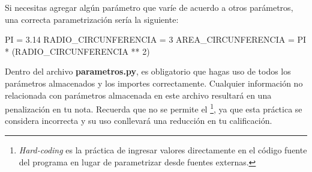 Si necesitas agregar algún parámetro que varíe de acuerdo a otros parámetros, una correcta parametrización sería la siguiente:

\begin{python}
PI = 3.14
RADIO_CIRCUNFERENCIA = 3
AREA_CIRCUNFERENCIA = PI * (RADIO_CIRCUNFERENCIA ** 2)
\end{python}

Dentro del archivo \textbf{parametros.py}, es obligatorio que hagas uso de todos los parámetros almacenados y los importes correctamente. Cualquier información no relacionada con parámetros almacenada en este archivo resultará en una penalización en tu nota. Recuerda que no se permite el \footnote{\textit{Hard-coding} es la práctica de ingresar valores directamente en el código fuente del programa en lugar de parametrizar desde fuentes externas.}, ya que esta práctica se considera incorrecta y su uso conllevará una reducción en tu calificación.